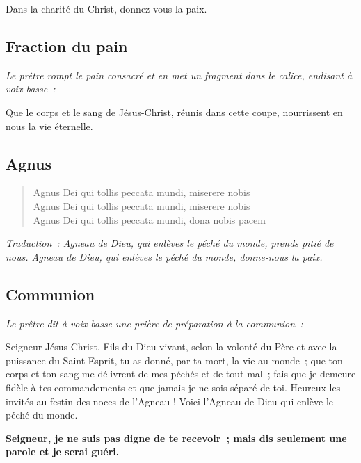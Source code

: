 Dans la charité du Christ, donnez-vous la paix.

\subsection*{Fraction du pain}

\emph{Le prêtre rompt le pain consacré et en met un fragment dans le            
calice, endisant à voix basse~:}

Que le corps et le sang de Jésus-Christ, réunis dans cette coupe,
nourrissent en nous la vie éternelle.

\subsection*{Agnus}

\begin{verse}
 Agnus Dei qui tollis peccata mundi, miserere nobis \\
 Agnus Dei qui tollis peccata mundi, miserere nobis \\
 Agnus Dei qui tollis peccata mundi, dona nobis pacem \\
\end{verse}

\emph{Traduction~:                                                              
Agneau de Dieu, qui enlèves le péché du monde,                                  
prends pitié de nous.                                                           
Agneau de Dieu, qui enlèves le péché du monde,                                  
donne-nous la paix.}

\subsection*{Communion}

\emph{Le prêtre dit à voix basse une prière de préparation à la                 
communion~:}

Seigneur Jésus Christ, Fils du Dieu vivant, selon la volonté du Père
et avec la puissance du Saint-Esprit, tu as donné, par ta mort, la vie
au monde~; que ton corps et ton sang me délivrent de mes péchés et de
tout mal~; fais que je demeure fidèle à tes commandements et que
jamais je ne sois séparé de toi.
Heureux les invités au festin des noces de l'Agneau !
Voici l'Agneau de Dieu qui enlève le péché du monde.

{\bf Seigneur, je ne suis pas digne de te recevoir~;                            
mais dis seulement une parole et je serai guéri.}

